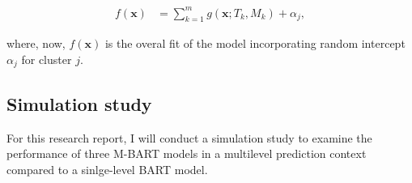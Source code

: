 \documentclass[10pt, a4paper, titlepage]{article}
\begin{document}
\begin{subequations}
\label{eq:M-BART}
\begin{align}
f(\textbf{x}) &= \sum^{m}_{k=1}g(\textbf{x}; T_{k}, M_{k}) + \alpha_{j}, \tag{3}
\end{align}
\end{subequations}

where, now, $f(\textbf{x})$ is the overal fit of the model incorporating random intercept $\alpha_{j}$ for cluster $j$.

\subsection{Simulation study}
For this research report, I will conduct a simulation study to examine the performance of three M-BART models in a multilevel prediction context compared to a sinlge-level BART model.
\end{document}
